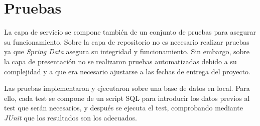 \section{Pruebas}

La capa de servicio se compone también de un conjunto de pruebas para asegurar su funcionamiento. Sobre la capa de repositorio no es necesario realizar pruebas ya que \emph{Spring Data} asegura su integridad y funcionamiento. Sin embargo, sobre la capa de presentación no se realizaron pruebas automatizadas debido a su complejidad y a que era necesario ajustarse a las fechas de entrega del proyecto.

Las pruebas implementaron y ejecutaron sobre una base de datos en local. Para ello, cada test se compone de un script SQL para introducir los datos previos al test que serán necesarios, y después se ejecuta el test, comprobando mediante \emph{JUnit}\cite{junit} que los resultados son los adecuados.


